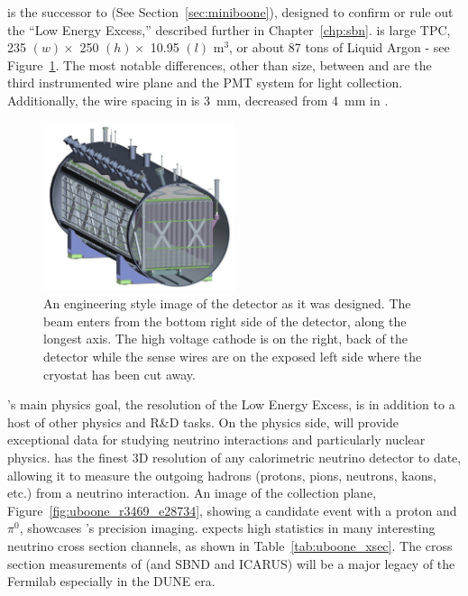 \uboone \cite{Chen:2007ae} is the successor to \MB \cite{AguilarArevalo:2008qa} (See Section~\ref{sec:miniboone}), designed to confirm or rule out the \MB ``Low Energy Excess,'' described further in Chapter~\ref{chp:sbn}.  \uboone is large TPC, 235 $ (w) \times $ 250 $ (h) \times $ 10.95 $ (l) $ m$^3$, or about 87 tons of Liquid Argon - see Figure~\ref{fig:uboone_det}.  The most notable differences, other than size, between \argoneut and \uboone are the third instrumented wire plane and the PMT system for light collection.  Additionally, the wire spacing in \uboone is 3~mm, decreased from 4~mm in \argoneut.

\begin{figure}[htb]
  \centering
  \includegraphics[width=0.5\textwidth]{lartpc_figures/uboone_tpc.jpg}
  \caption[\uboone Detector Design]{An engineering style image of the \uboone detector as it was designed.  The beam enters from the bottom right side of the detector, along the longest axis.  The high voltage cathode is on the right, back of the detector while the sense wires are on the exposed left side where the cryostat has been cut away.}
  \label{fig:uboone_det}
\end{figure}

\uboone's main physics goal, the resolution of the Low Energy Excess, is in addition to a host of other physics and R\&D tasks.  On the physics side, \uboone will provide exceptional data for studying neutrino interactions and particularly nuclear physics.  \uboone has the finest 3D resolution of any calorimetric neutrino detector to date, allowing it to measure the outgoing hadrons (protons, pions, neutrons, kaons, etc.) from a neutrino interaction.  An image of the \uboone collection plane, Figure~\ref{fig:uboone_r3469_e28734}, showing a \numu candidate event with a proton and $\pi^0$, showcases \uboone's precision imaging.  \uboone expects high statistics in many interesting neutrino cross section channels, as shown in Table~\ref{tab:uboone_xsec}.  The cross section measurements of \uboone (and SBND and ICARUS) will be a major legacy of the Fermilab \lartpcs especially in the DUNE\cite{DUNE} era.


